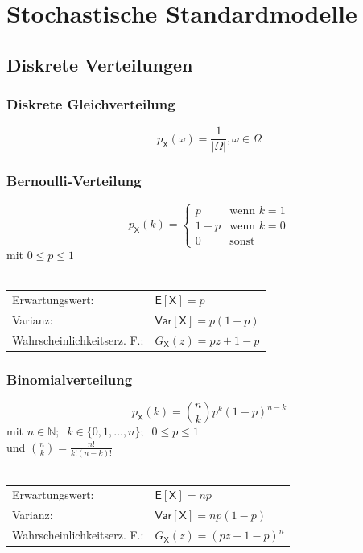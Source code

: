 \documentclass[a4paper,twocolumn,10pt]{article}
\newcommand{\varX}{\mathsf{Var[X]}}
\newcommand{\erwX}{\mathsf{E[X]}}
\newcommand{\X}{\mathsf{X}}
\begin{document}
\section{Stochastische Standardmodelle}

\subsection {Diskrete Verteilungen}

\subsubsection{Diskrete Gleichverteilung}
\[p_\mathsf X(\omega) = \frac{1}{|\Omega|}, \omega \in \Omega\]

\subsubsection{Bernoulli-Verteilung}
\[p_\mathsf X(k) = \begin{cases}
  p  & \text{wenn }k = 1\\
  1-p & \text{wenn }k = 0\\
0 & \text{sonst}
\end{cases}\]
mit $0\leq p\leq 1$\\\\
\begin{tabular}{ll}
Erwartungswert: & $\erwX=p$\\
Varianz: &$\varX=p(1-p)$\\
Wahrscheinlichkeitserz. F.: &$G_\X(z)=pz+1-p$
\end{tabular}

\subsubsection{Binomialverteilung}
\[p_\mathsf X(k) = \binom n k p^k(1-p)^{n-k}\]
mit $ n \in \mathbb N;\;\;k \in \{ 0,1,\dots,n \};\;\;0\leq p\leq 1$\\
und $\binom{n}{k}=\frac{n!}{k!(n-k)!}$\\\\
\begin{tabular}{ll}
Erwartungswert: &$\erwX=np$\\
Varianz: &$\varX=np(1-p)$\\
Wahrscheinlichkeitserz. F.: &$G_\X(z)=(pz+1-p)^n$
\end{tabular}
\end{document}
